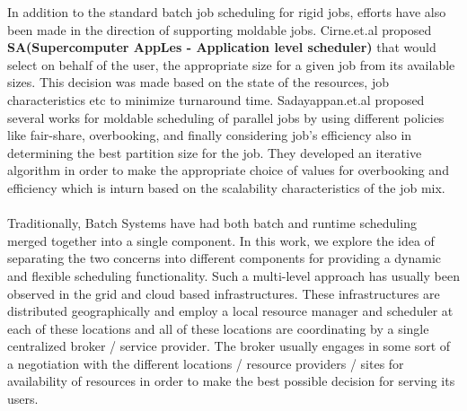 In addition to the standard batch job scheduling for rigid jobs, efforts have also been made in the direction of supporting moldable jobs. Cirne.et.al\cite{wcirne} proposed \textbf{SA(Supercomputer AppLes - Application level scheduler)} that would select on behalf of the user, the appropriate size for a given job from its available sizes. This decision was made based on the state of the resources, job characteristics etc to minimize turnaround time. Sadayappan.et.al\cite{sabin}\cite{srividya}\cite{sudha} proposed several works for moldable scheduling of parallel jobs by using different policies like fair-share, overbooking, and finally considering job's efficiency also in determining the best partition size for the job. They developed an iterative algorithm in order to make the appropriate choice of values for overbooking and efficiency which is inturn based on the scalability characteristics of the job mix.\\ \\
Traditionally, Batch Systems have had both batch and runtime scheduling merged together into a single component. In this work, we explore the idea of separating the two concerns into different components for providing a dynamic and flexible scheduling functionality. Such a multi-level approach has usually been observed in the grid and cloud based infrastructures\cite{kwang}\cite{kurowski}\cite{streit}. These infrastructures are distributed geographically and employ a local resource manager and scheduler at each of these locations and all of these locations are coordinating by a single centralized broker / service provider. The broker usually engages in some sort of a negotiation\cite{oliver}\cite{roland}\cite{viktor}\cite{rizos} with the different locations / resource providers / sites for availability of resources in order to make the best possible decision for serving its users.

